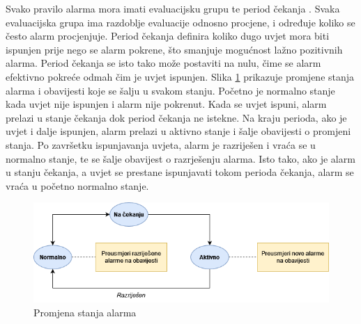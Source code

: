 Svako pravilo alarma mora imati evaluacijsku grupu te period čekanja . Svaka evaluacijska grupa ima razdoblje evaluacije odnosno procjene, i određuje koliko se često alarm procjenjuje. Period čekanja definira koliko dugo uvjet mora biti ispunjen prije nego se alarm pokrene, što smanjuje mogućnost lažno pozitivnih alarma. Period čekanja se isto tako može postaviti na nulu, čime se alarm efektivno pokreće odmah čim je uvjet ispunjen. Slika \ref{fig:alerting_resolved} prikazuje promjene stanja alarma i obavijesti koje se šalju u svakom stanju. Početno je normalno stanje kada uvjet nije ispunjen i alarm nije pokrenut. Kada se uvjet ispuni, alarm prelazi u stanje čekanja  dok period čekanja ne istekne. Na kraju perioda, ako je uvjet i dalje ispunjen, alarm prelazi u aktivno stanje i šalje obavijesti o promjeni stanja. Po završetku ispunjavanja uvjeta, alarm je razriješen i vraća se u normalno stanje, te se šalje obavijest o razrješenju alarma. Isto tako, ako je alarm u stanju čekanja, a uvjet se prestane ispunjavati tokom perioda čekanja, alarm se vraća u početno normalno stanje. 

\begin{figure}[ht]
	\centering
	\includegraphics[scale=0.6]{imgs/alerting_resolved}
	\caption{Promjena stanja alarma \cite{grafana}}
	\label{fig:alerting_resolved}
\end{figure}

